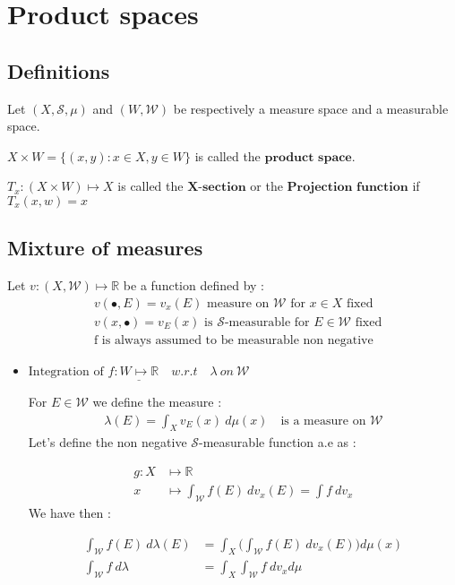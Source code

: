 \section{Product spaces}
\subsection{Definitions}
Let $(X,\mathcal{S},\mu)$ and $(W,\mathcal{W})$ be respectively a measure space and a measurable space.

$X\times W = \{(x,y) : x \in X, y \in W\}$ is called the $\textbf{product space}$.

$T_x:(X\times W ) \longmapsto  X$ is called the $\textbf{X-section}$ or the $\textbf{Projection function}$ if $T_x(x,w) = x$
\subsection{Mixture of measures}
Let $v : (X, \mathcal{W}) \longmapsto \mathbb{R} $ be a function defined by :
\begin{align*}
&v(\bullet, E) = v_x(E) \text{ measure on $\mathcal{W}$ for $x \in X$ fixed} \\
&v(x, \bullet) = v_E(x) \text{ is $\mathcal{S}$-measurable for $E \in \mathcal{W}$ fixed} \\
&\text{f is always assumed to be measurable non negative}
\end{align*}

\begin{itemize}
\item $\underline{\text{Integration of }f:W \longmapsto \mathbb{R} \quad w.r.t \quad \lambda \:on\: \mathcal{W}}$

For $E \in \mathcal{W}$ we define the measure :
\begin{align*}
\lambda(E) = \int_X v_E(x)\:d\mu(x)\quad \text{is a measure on } \mathcal{W}
\end{align*}
Let's define the non negative $\mathcal{S}$-measurable function a.e as :

\begin{align*}
g : X &\longmapsto \mathbb{R} \\
x &\longmapsto \int_{\mathcal{W}}f(E)\:dv_x(E) = \int f\:dv_x
\end{align*}
We have then : 

\begin{align*}
\int_{\mathcal{W}}f(E)\:d\lambda(E) &= \int_X\Big(\int_{\mathcal{W}}f(E)\:dv_x(E)\Big)d\mu(x) \\
\int_{\mathcal{W}}f\:d\lambda &= \int_X\int_{\mathcal{W}}f\:dv_xd\mu
\end{align*}
\end{itemize}

